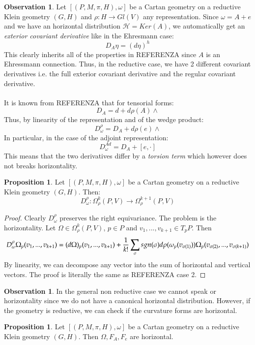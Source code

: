 \documentclass[12pt,a4paper]{report}
\theoremstyle{definition}
\theoremstyle{Theorem}
\newtheorem{Prop}[Def]{Proposition}
\theoremstyle{break}
\theoremstyle{definition}
\newtheorem{Obs}[Def]{Observation}
\begin{document}
	\begin{Obs}
		Let $[(P,M,\pi,H),\omega]$ be a Cartan geometry on a reductive Klein geometry $(G,H)$ and $\rho:H\rightarrow Gl(V)$ any representation. Since $\omega=A+e$ and we have an horizontal distribution $\mathcal{H}=Ker(A)$, we automatically get an \textit{exterior covariant derivative} like in the Ehresmann case:
		$$D_A\eta=(d\eta)^h$$
		This clearly inherits all of the properties in REFERENZA since $A$ is an Ehressmann connection. Thus, in the reductive case, we have 2 different covariant derivatives i.e. the full exterior covariant derivative and the regular covariant derivative. \\
		\\
		It is known from REFERENZA that for tensorial forms:
		$$D_A=d+d\rho(A)\wedge$$
		Thus, by linearity of the representation and of the wedge product:
		$$D_\omega^{\rho}=D_A+d\rho(e)\wedge$$
		In particular, in the case of the adjoint representation:
		$$D_\omega^{Ad}=D_A+[e,\cdot]$$
		This means that the two derivatives differ by a \textit{torsion term} which however does not breaks horizontality.
	\end{Obs}
	\begin{Prop}
		Let $[(P,M,\pi,H),\omega]$ be a Cartan geometry on a reductive Klein geometry $(G,H)$. Then:
		$$D_\omega^\rho:\Omega^k_{\rho}(P,V)\rightarrow \Omega^{k+1}_{\rho}(P,V)$$
	\end{Prop}
	\begin{proof}
		Clearly $D_\omega^\rho$ preserves the right equivariance. The problem is the horizontality. Let $\Omega\in\Omega^k_\rho(P,V)$, $p\in P$ and $v_1,...,v_{k+1}\in T_pP$. Then 
		$$D_\omega^\rho\Omega_p(v_1,...,v_{k+1})=(d\Omega)_p(v_1,...,v_{k+1})+{1\over k!}\sum_\sigma sgn(\sigma)d\rho(\omega_p(v_{\sigma(1)}))\Omega_p(v_{\sigma(2)},...,v_{\sigma(k+1)})$$
		By linearity, we can decompose any vector into the sum of horizontal and vertical vectors. The proof is literally the same as REFERENZA case 2.
	\end{proof}
	\begin{Obs}
		In the general non reductive case we cannot speak or horizontality since we do not have a canonical horizontal distribution. However, if the geometry is reductive, we can check if the curvature forms are horizontal. 
	\end{Obs}
	\begin{Prop}
		Let $[(P,M,\pi,H),\omega]$ be a Cartan geometry on a reductive Klein geometry $(G,H)$. Then $\Omega, F_A,F_e$ are horizontal.
	\end{Prop}
\end{document}
